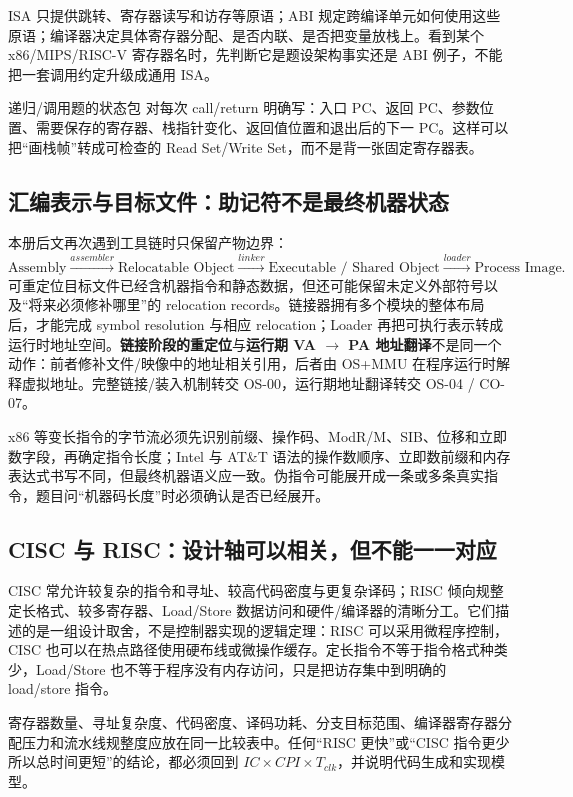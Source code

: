 \documentclass[UTF8,fontset=fandol,11pt,a4paper]{ctexart}
\newcommand{\kw}[1]{\textbf{\color{deep}#1}}
\begin{document}
ISA 只提供跳转、寄存器读写和访存等原语；ABI 规定跨编译单元如何使用这些原语；编译器决定具体寄存器分配、是否内联、是否把变量放栈上。看到某个 x86/MIPS/RISC-V 寄存器名时，先判断它是题设架构事实还是 ABI 例子，不能把一套调用约定升级成通用 ISA。

\begin{methodbox}{递归/调用题的状态包}
对每次 call/return 明确写：入口 PC、返回 PC、参数位置、需要保存的寄存器、栈指针变化、返回值位置和退出后的下一 PC。这样可以把“画栈帧”转成可检查的 Read Set/Write Set，而不是背一张固定寄存器表。
\end{methodbox}

\subsection{汇编表示与目标文件：助记符不是最终机器状态}

本册后文再次遇到工具链时只保留产物边界：
\[
\text{Assembly}
\xrightarrow{assembler}\text{Relocatable Object}
\xrightarrow{linker}\text{Executable / Shared Object}
\xrightarrow{loader}\text{Process Image}.
\]
可重定位目标文件已经含机器指令和静态数据，但还可能保留未定义外部符号以及“将来必须修补哪里”的 relocation records。链接器拥有多个模块的整体布局后，才能完成 symbol resolution 与相应 relocation；Loader 再把可执行表示转成运行时地址空间。\kw{链接阶段的重定位}与\kw{运行期 VA $\to$ PA 地址翻译}不是同一个动作：前者修补文件/映像中的地址相关引用，后者由 OS+MMU 在程序运行时解释虚拟地址。完整链接/装入机制转交 OS-00，运行期地址翻译转交 OS-04 / CO-07。

x86 等变长指令的字节流必须先识别前缀、操作码、ModR/M、SIB、位移和立即数字段，再确定指令长度；Intel 与 AT\&T 语法的操作数顺序、立即数前缀和内存表达式书写不同，但最终机器语义应一致。伪指令可能展开成一条或多条真实指令，题目问“机器码长度”时必须确认是否已经展开。

\subsection{CISC 与 RISC：设计轴可以相关，但不能一一对应}

CISC 常允许较复杂的指令和寻址、较高代码密度与更复杂译码；RISC 倾向规整定长格式、较多寄存器、Load/Store 数据访问和硬件/编译器的清晰分工。它们描述的是一组设计取舍，不是控制器实现的逻辑定理：RISC 可以采用微程序控制，CISC 也可以在热点路径使用硬布线或微操作缓存。定长指令不等于指令格式种类少，Load/Store 也不等于程序没有内存访问，只是把访存集中到明确的 load/store 指令。

寄存器数量、寻址复杂度、代码密度、译码功耗、分支目标范围、编译器寄存器分配压力和流水线规整度应放在同一比较表中。任何“RISC 更快”或“CISC 指令更少所以总时间更短”的结论，都必须回到 $IC\times CPI\times T_{clk}$，并说明代码生成和实现模型。
\end{document}
